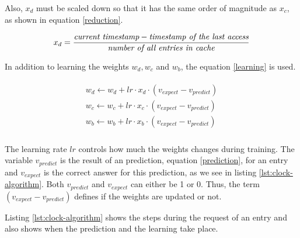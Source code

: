 \documentclass[
	12pt,
	a4paper,
	abstract,
	bibliography=totoc,
	chapterprefix,
	headings=openright,
	numbers=endperiod,
	parskip=half,
	twoside,
]{scrreprt}
\begin{document}
Also, $x_d$ must be scaled down so that it has the same order of magnitude as $x_c$, as shown in equation \ref{reduction}.

\begin{align}
	x_d = \frac{\emph{current timestamp} - \emph{timestamp of the last access}}{\emph{number of all entries in cache}} \label{reduction}
\end{align}
	
In addition to learning the weights $w_d, w_c$ and $w_b$, the equation \ref{learning} is used.

\begin{align}
\begin{split}
	w_d \leftarrow w_d + lr \cdot x_d \cdot (v_{expect} - v_{predict})\\
	w_c \leftarrow w_c + lr \cdot x_c \cdot (v_{expect} - v_{predict})\\
	w_b \leftarrow w_b + lr \cdot x_b \cdot (v_{expect} - v_{predict})\\
\end{split} \label{learning}
\end{align}

The learning rate $lr$ controls how much the weights changes during training.
The variable $v_{predict}$ is the result of an prediction, equation \ref{prediction}, for an entry and 
$v_{expect}$ is the correct answer for this prediction, as we see in listing \ref{lst:clock-algorithm}.
Both $v_{predict}$ and $v_{expect}$ can either be 1 or 0.
Thus, the term $(v_{expect} - v_{predict})$ defines if the weights are updated or not.


Listing \ref{lst:clock-algorithm} shows the steps during the request of an entry and also shows when 
the prediction and the learning take place.

\bigskip
\end{document}
